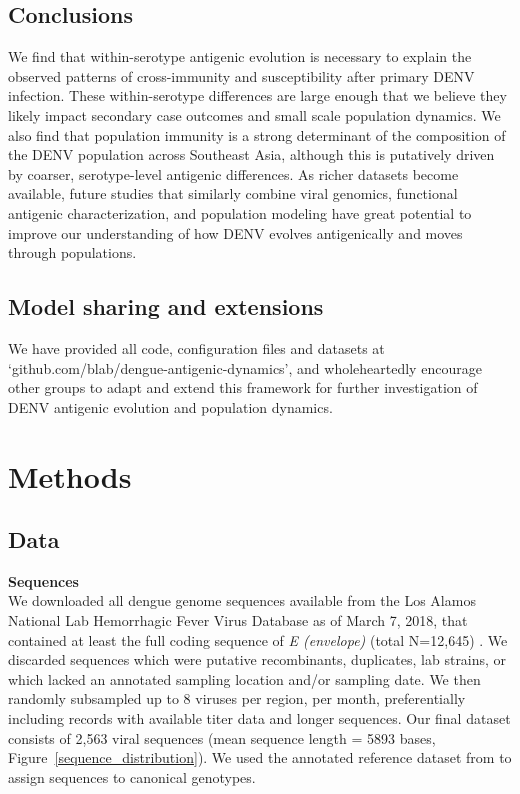 \documentclass[11pt,oneside,letterpaper]{article}
\begin{document}
\subsection*{Conclusions}
We find that within-serotype antigenic evolution is necessary to explain the observed patterns of cross-immunity and susceptibility after primary DENV infection.
These within-serotype differences are large enough that we believe they likely impact secondary case outcomes and small scale population dynamics.
We also find that population immunity is a strong determinant of the composition of the DENV population across Southeast Asia, although this is putatively driven by coarser, serotype-level antigenic differences.
As richer datasets become available, future studies that similarly combine viral genomics, functional antigenic characterization, and population modeling have great potential to improve our understanding of how DENV evolves antigenically and moves through populations.

\subsection*{Model sharing and extensions}
We have provided all code, configuration files and datasets at `github.com/blab/dengue-antigenic-dynamics', and wholeheartedly encourage other groups to adapt and extend this framework for further investigation of DENV antigenic evolution and population dynamics.


\newpage

\section*{Methods}
\subsection*{Data}
\textbf{Sequences}\\
We downloaded all dengue genome sequences available from the Los Alamos National Lab Hemorrhagic Fever Virus Database as of March 7, 2018, that contained at least the full coding sequence of \textit{E (envelope)} (total N=12,645) \citep{kuiken2011lanl}.
We discarded sequences which were putative recombinants, duplicates, lab strains, or which lacked an annotated sampling location and/or sampling date.
We then randomly subsampled up to 8 viruses per region, per month, preferentially including records with available titer data and longer sequences.
Our final dataset consists of 2,563 viral sequences (mean sequence length = 5893 bases, Figure~\ref{sequence_distribution}).
We used the annotated reference dataset from \citep{pyke2016highly} to assign sequences to canonical genotypes.
\end{document}
